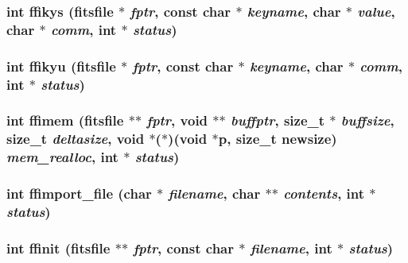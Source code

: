 \subsubsection{\setlength{\rightskip}{0pt plus 5cm}int ffikys (\bf{fitsfile} $\ast$ {\em fptr}, const char $\ast$ {\em keyname}, char $\ast$ {\em value}, char $\ast$ {\em comm}, int $\ast$ {\em status})}\label{src_2fitsio_8h_05970f0b7eb3d0035419ea3aaddb3517}


\subsubsection{\setlength{\rightskip}{0pt plus 5cm}int ffikyu (\bf{fitsfile} $\ast$ {\em fptr}, const char $\ast$ {\em keyname}, char $\ast$ {\em comm}, int $\ast$ {\em status})}\label{src_2fitsio_8h_ac2fa658a69fab1f16bd0b0b5d492bd3}


\subsubsection{\setlength{\rightskip}{0pt plus 5cm}int ffimem (\bf{fitsfile} $\ast$$\ast$ {\em fptr}, void $\ast$$\ast$ {\em buffptr}, size\_\-t $\ast$ {\em buffsize}, size\_\-t {\em deltasize}, void $\ast$($\ast$)(void $\ast$p, size\_\-t newsize) {\em mem\_\-realloc}, int $\ast$ {\em status})}\label{src_2fitsio_8h_ad075adabaf2dc2bcd43717eaed768fa}


\subsubsection{\setlength{\rightskip}{0pt plus 5cm}int ffimport\_\-file (char $\ast$ {\em filename}, char $\ast$$\ast$ {\em contents}, int $\ast$ {\em status})}\label{src_2fitsio_8h_39fd7b9ba945cd1b97c979d71dd85184}


\subsubsection{\setlength{\rightskip}{0pt plus 5cm}int ffinit (\bf{fitsfile} $\ast$$\ast$ {\em fptr}, const char $\ast$ {\em filename}, int $\ast$ {\em status})}\label{src_2fitsio_8h_7bcc7eb7ff6f0bf2ab7f40cc161b6dc0}



